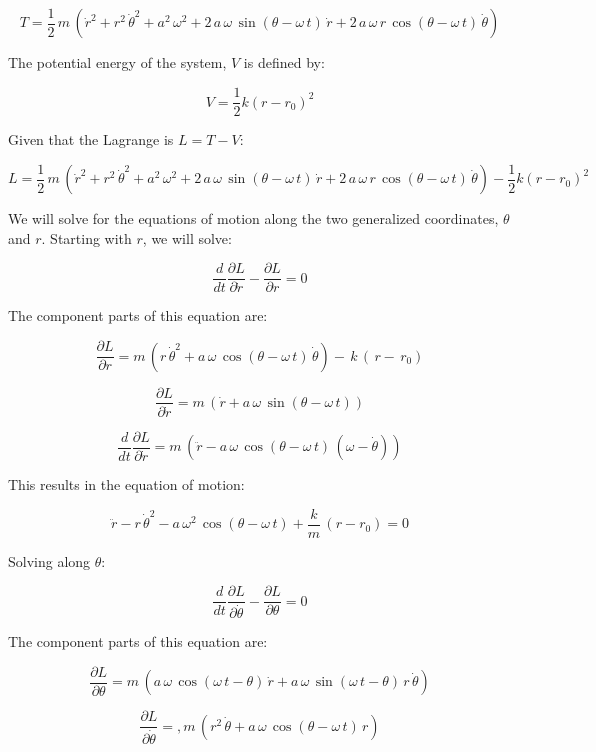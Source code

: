 \documentclass[12pt, letterpaper]{../assignment}
\begin{document}
$$ T = \frac{1}{2}\,m\,\left({\dot{r}}^2+{r}^2\,{\dot{\theta}}^2+a^2\,\omega ^2+2\,a\,\omega \,\sin\left(\theta -\omega \,t\right)\,\dot{r}+2\,a\,\omega \,r\,\cos\left(\theta -\omega \,t\right)\,\dot{\theta} \right)  $$

The potential energy of the system, $V$ is defined by:

$$ V = \frac{1}{2}k\left( r - r_0 \right)^2 $$


Given that the Lagrange is $ L = T - V $:

$$ L = \frac{1}{2}\,m\,\left({\dot{r}}^2+{r}^2\,{\dot{\theta}}^2+a^2\,\omega ^2+2\,a\,\omega \,\sin\left(\theta -\omega \,t\right)\,\dot{r}+2\,a\,\omega \,r\,\cos\left(\theta -\omega \,t\right)\,\dot{\theta} \right)
- \frac{1}{2}k\left( r - r_0 \right)^2  $$

We will solve for the equations of motion along the two generalized coordinates, $\theta$ and $r$.
Starting with $r$, we will solve:

$$ \frac{d}{d t} \frac{\partial L}{\partial \dot{r}} - \frac{\partial L}{\partial r} = 0 $$

The component parts of this equation are:

$$ \frac{\partial L}{\partial r} = 
m\,\left(r\,{\dot{\theta} }^2+a\,\omega \,\cos\left(\theta -\omega \,t\right)\,\dot{\theta} \right) -\,k\,\left(\,r-\,r_{0}\right) $$

$$ \frac{\partial L}{\partial \dot{r}}  =
m\,\left(\dot{r}+a\,\omega \,\sin\left(\theta -\omega \,t\right)\right) $$

$$ \frac{d}{d t} \frac{\partial L}{\partial \dot{r}} =
m\,\left(\ddot{r}-a\,\omega \,\cos\left(\theta -\omega \,t\right)\,\left(\omega -\dot{\theta} \right)\right) $$

This results in the equation of motion:

$$ \ddot{r}-r\,{\dot{\theta} }^2-a\,\omega ^2\,\cos\left(\theta -\omega \,t\right) + \frac{k}{m}\,(r-r_{0}) = 0 $$

Solving along $\theta$:

$$ \frac{d}{d t} \frac{\partial L}{\partial \dot{\theta}} - \frac{\partial L}{\partial \theta} = 0 $$

The component parts of this equation are:

$$ \frac{\partial L}{\partial \theta} = 
m\,\left(a\,\omega \,\cos\left(\omega \,t-\theta \right)\,\dot{r}+a\,\omega \,\sin\left(\omega \,t-\theta \right)\,r\,\dot{\theta} \right) $$

$$ \frac{\partial L}{\partial \dot{\theta}}  =
,m\,\left({r}^2\,\dot{\theta} +a\,\omega \,\cos\left(\theta -\omega \,t\right)\,r\right) $$
\end{document}
